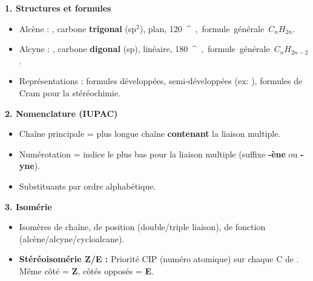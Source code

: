 \documentclass[11pt]{article}
\providecommand{\degree}{^{\circ}}
\newcommand{\cle}[1]{{\popxbold\color{popdark}#1}}
\begin{document}
\begin{aretenir}
\textbf{1. Structures et formules}
\begin{itemize}
  \item \cle{Alcène} : , carbone \textbf{trigonal} (sp$^2$), plan, \SI{120}{\degree}, formule générale \textbf{$C_nH_{2n}$}.
  \item \cle{Alcyne} : , carbone \textbf{digonal} (sp), linéaire, \SI{180}{\degree}, formule générale \textbf{$C_nH_{2n-2}$}.
  \item Représentations : formules développées, semi-développées (ex: ), formules de Cram pour la stéréochimie.
\end{itemize}

\textbf{2. Nomenclature (IUPAC)}
\begin{itemize}
  \item Chaîne principale = plus longue chaîne \textbf{contenant} la liaison multiple.
  \item Numérotation = indice le plus bas pour la liaison multiple (suffixe \textbf{-ène} ou \textbf{-yne}).
  \item Substituants par ordre alphabétique.
\end{itemize}

\textbf{3. Isomérie}
\begin{itemize}
  \item Isomères de chaîne, de position (double/triple liaison), de fonction (alcène/alcyne/cycloalcane).
  \item \textbf{Stéréoisomérie Z/E :} Priorité CIP (numéro atomique) sur chaque C de . Même côté = \textbf{Z}, côtés opposés = \textbf{E}.
\end{itemize}


\end{aretenir}
\end{document}
